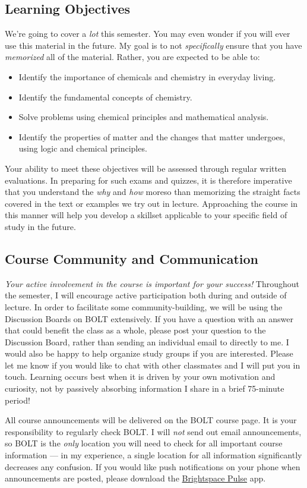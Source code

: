 \documentclass[11pt,letterpaper]{article}
\begin{document}
\subsection{Learning Objectives}
We're going to cover a \emph{lot} this semester. You may even wonder if you will
ever use this material in the future. My goal is to not \emph{specifically}
ensure that you have \emph{memorized} all of the material. Rather, you are
expected to be able to:
\begin{itemize}[noitemsep]
	\item Identify the importance of chemicals and chemistry in everyday
		living.
	\item Identify the fundamental concepts of chemistry.
	\item Solve problems using chemical principles and mathematical
		analysis.
	\item Identify the properties of matter and the changes that matter
		undergoes, using logic and chemical principles.
\end{itemize}
Your ability to meet these objectives will be assessed through regular written
evaluations. In preparing for such exams and quizzes, it is therefore imperative
that you understand the \emph{why} and \emph{how} moreso than memorizing the
straight facts covered in the text or examples we try out in lecture.
Approaching the course in this manner will help you develop a skillset
applicable to your specific field of study in the future.

\subsection{Course Community and Communication}
\emph{Your active involvement in the course is important for your success!}
Throughout the semester, I will encourage active participation both during and
outside of lecture. In order to facilitate some community-building, we will be
using the Discussion Boards on BOLT extensively. If you have a question with an
answer that could benefit the class as a whole, please post your question to the
Discussion Board, rather than sending an individual email to directly to me. I
would also be happy to help organize study groups if you are interested. Please
let me know if you would like to chat with other classmates and I will put you
in touch. Learning occurs best when it is driven by your own motivation and
curiosity, not by passively absorbing information I share in a brief 75-minute
period!

All course announcements will be delivered on the BOLT course page. It is your
responsibility to regularly check BOLT. I will \emph{not} send out email
announcements, so BOLT is the \emph{only} location you will need to check for
all important course information --- in my experience, a single location for all
information significantly decreases any confusion. If you would like push
notifications on your phone when announcements are posted, please download the
\href{https://documentation.brightspace.com/EN/brightspace/requirements/all/pulse.htm}{Brightspace
Pulse} app.
\end{document}
